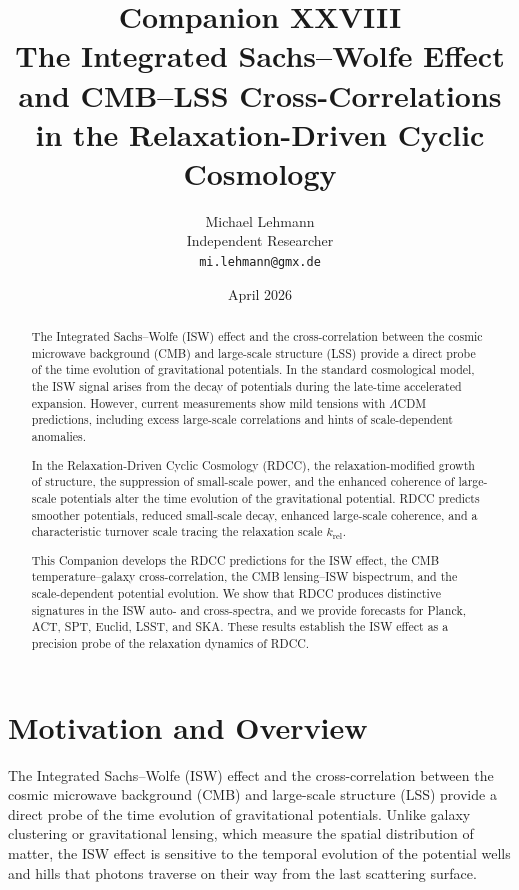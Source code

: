 \documentclass[11pt,a4paper]{article}
\title{
\textbf{Companion XXVIII}\\[4mm]
\textbf{The Integrated Sachs–Wolfe Effect and CMB–LSS Cross-Correlations}\\
\textbf{in the Relaxation-Driven Cyclic Cosmology}
}
\author{
Michael Lehmann\\
Independent Researcher\\
\texttt{mi.lehmann@gmx.de}
}
\date{April 2026}
\begin{document}
\maketitle

\begin{abstract}
The Integrated Sachs–Wolfe (ISW) effect and the cross-correlation between the cosmic 
microwave background (CMB) and large-scale structure (LSS) provide a direct probe of the 
time evolution of gravitational potentials. In the standard cosmological model, the ISW 
signal arises from the decay of potentials during the late-time accelerated expansion. 
However, current measurements show mild tensions with $\Lambda$CDM predictions, including 
excess large-scale correlations and hints of scale-dependent anomalies.

In the Relaxation-Driven Cyclic Cosmology (RDCC), the relaxation-modified growth of 
structure, the suppression of small-scale power, and the enhanced coherence of large-scale 
potentials alter the time evolution of the gravitational potential. RDCC predicts smoother 
potentials, reduced small-scale decay, enhanced large-scale coherence, and a characteristic 
turnover scale tracing the relaxation scale $k_{\mathrm{rel}}$.

This Companion develops the RDCC predictions for the ISW effect, the CMB temperature–galaxy 
cross-correlation, the CMB lensing–ISW bispectrum, and the scale-dependent potential 
evolution. We show that RDCC produces distinctive signatures in the ISW auto- and 
cross-spectra, and we provide forecasts for Planck, ACT, SPT, Euclid, LSST, and SKA. These 
results establish the ISW effect as a precision probe of the relaxation dynamics of RDCC.
\end{abstract}

\section{Motivation and Overview}

The Integrated Sachs–Wolfe (ISW) effect and the cross-correlation between the cosmic 
microwave background (CMB) and large-scale structure (LSS) provide a direct probe of the 
time evolution of gravitational potentials. Unlike galaxy clustering or gravitational 
lensing, which measure the spatial distribution of matter, the ISW effect is sensitive to 
the temporal evolution of the potential wells and hills that photons traverse on their way 
from the last scattering surface.
\end{document}
